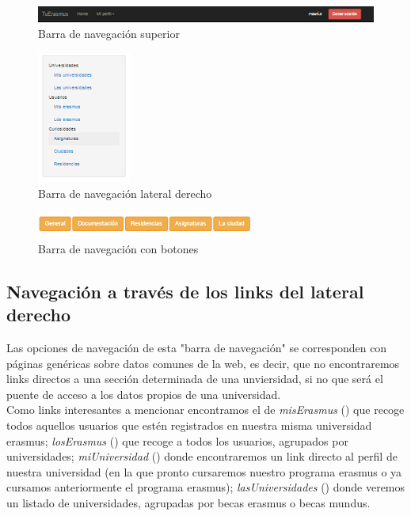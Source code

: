 \begin{figure}[htbp]
	
	\centering
	\includegraphics[scale=0.5]{./Figuras/tuerasmusPages/privatePages/navbarSup.png}
	\caption{Barra de navegaci\'on superior}
	\label{fig:navbarSup}
	
\end{figure}
\begin{figure}[htbp]
	
	\centering
	\includegraphics[scale=0.5]{./Figuras/tuerasmusPages/privatePages/navbarDch.png}
	\caption{Barra de navegaci\'on lateral derecho}
	\label{fig:navbarDch}
	
\end{figure}
\begin{figure}[htbp]
	
	\centering
	\includegraphics[scale=0.7]{./Figuras/tuerasmusPages/privatePages/navbarCen.png}
	\caption{Barra de navegaci\'on con botones}
	\label{fig:navbarCen}
	
\end{figure}

\subsection{Navegaci\'on a trav\'es de los links del lateral derecho}
Las opciones de navegaci\'on de esta "barra de navegaci\'on" se corresponden con p\'aginas gen\'ericas sobre datos comunes de la web, es decir, que no encontraremos links directos a una secci\'on determinada de una unviersidad, si no que ser\'a el puente de acceso a los datos propios de una universidad.\\

Como links interesantes a mencionar encontramos el de \textit{misErasmus} (\textit{}) que recoge todos aquellos usuarios que est\'en registrados en nuestra misma universidad erasmus; \textit{losErasmus} (\textit{}) que recoge a todos los usuarios, agrupados por universidades; \textit{miUniversidad} (\textit{}) donde encontraremos un link directo al perfil de nuestra universidad (en la que pronto cursaremos nuestro programa erasmus o ya cursamos anteriormente el programa erasmus); \textit{lasUniversidades} (\textit{}) donde veremos un listado de universidades, agrupadas por becas erasmus o becas mundus.\\

